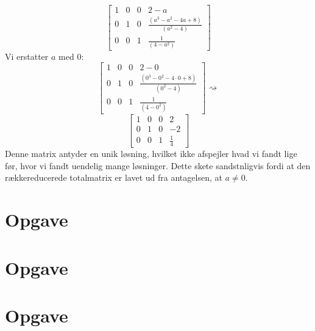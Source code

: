 \documentclass[a4paper,12pt]{article}
\begin{document}
\[
\left[\begin{array}{ccc|c}
    1 & 0 & 0 & 2-a \\
    0 & 1 & 0 & \frac{(a^3 - a^2 - 4a + 8)}{(a^2 - 4)} \\
    0 & 0 & 1 & \frac{1}{(4-a^2)}
\end{array}\right]
\]
Vi erstatter $a$ med 0:
\[
\left[\begin{array}{ccc|c}
    1 & 0 & 0 & 2-0 \\
    0 & 1 & 0 & \frac{(0^3 - 0^2 - 4\cdot0 + 8)}{(0^2 - 4)} \\
    0 & 0 & 1 & \frac{1}{(4-0^2)}
\end{array}\right]
\rightsquigarrow
\]
\[
\left[\begin{array}{ccc|c}
    1 & 0 & 0 & 2 \\
    0 & 1 & 0 & -2 \\
    0 & 0 & 1 & \frac{1}{4}
\end{array}\right]
\]
Denne matrix antyder en unik løsning, hvilket ikke afspejler hvad vi fandt lige før, hvor vi fandt uendelig mange løsninger. Dette skete sandstnligvis fordi at den rækkereducerede totalmatrix er lavet ud fra antagelsen, at $a \neq 0$.





\section[Opgave]{Opgave}

\section[Opgave]{Opgave}

\section[Opgave]{Opgave}
\end{document}
